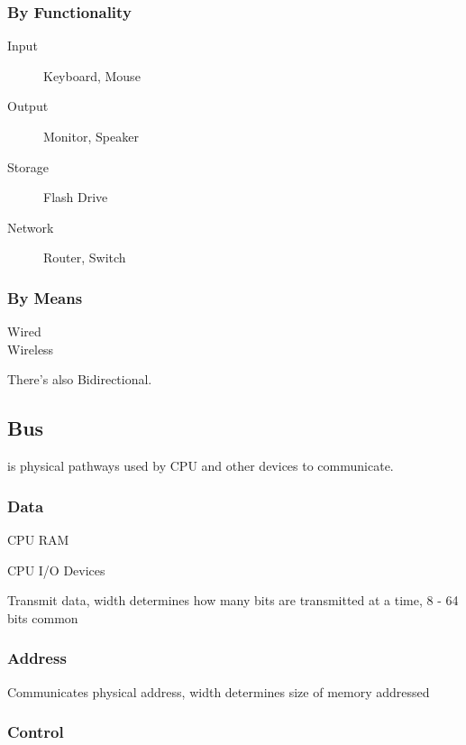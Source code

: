 \documentclass[11pt,journal,compsoc]{IEEEtran}
\begin{document}
\subsubsection{By Functionality}

\begin{description}
    \item[Input] Keyboard, Mouse
    
    \item[Output] Monitor, Speaker

    \item[Storage] Flash Drive

    \item[Network] Router, Switch
\end{description}

\subsubsection{By Means}

\begin{description}
    \item[Wired]
    \item[Wireless]
\end{description}

There's also Bidirectional.


\subsection{Bus}

is physical pathways used by CPU and other devices to communicate.


\subsubsection{Data}

CPU \leftrightarrow RAM

CPU \leftrightarrow I/O Devices

Transmit data, width determines how many bits are transmitted at a time, 8 - 64 bits common


\subsubsection{Address}

Communicates physical address, width determines size of memory addressed


\subsubsection{Control}
\end{document}
